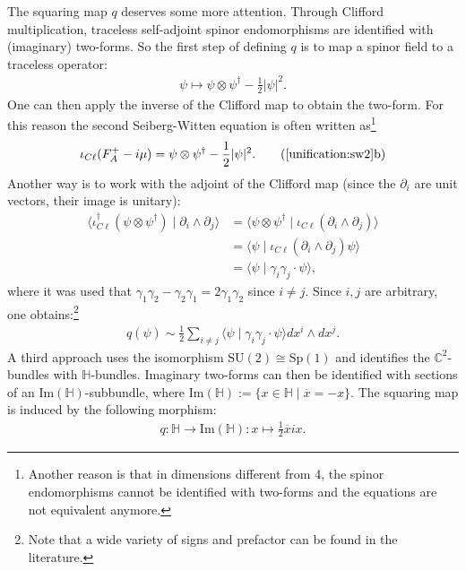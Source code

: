     \begin{construct}
        The squaring map $q$ deserves some more attention. Through Clifford multiplication, traceless self-adjoint spinor endomorphisms are identified with (imaginary) two-forms. So the first step of defining $q$ is to map a spinor field to a traceless operator:
        \begin{gather}
            \psi\mapsto\psi\otimes\psi^\dagger - \frac{1}{2}|\psi|^2.
        \end{gather}
        One can then apply the inverse of the Clifford map to obtain the two-form. For this reason the second Seiberg-Witten equation is often written as\footnote{Another reason is that in dimensions different from 4, the spinor endomorphisms cannot be identified with two-forms and the equations are not equivalent anymore.}
        \begin{gather}
            \iota_{C\ell}(F_A^+-i\mu) = \psi\otimes\psi^\dagger-\frac{1}{2}|\psi|^2.
            \tag{\ref*{unification:sw2}b}
        \end{gather}
        Another way is to work with the adjoint of the Clifford map (since the $\partial_i$ are unit vectors, their image is unitary):
        \begin{align*}
            \langle\iota_{C\ell}^\dagger(\psi\otimes\psi^\dagger)\mid\partial_i\wedge\partial_j\rangle &= \langle\psi\otimes\psi^\dagger\mid\iota_{C\ell}(\partial_i\wedge\partial_j)\rangle\\
            &= \langle\psi\mid\iota_{C\ell}(\partial_i\wedge\partial_j)\psi\rangle\\
            &= \langle\psi\mid\gamma_i\gamma_j\cdot\psi\rangle,
        \end{align*}
        where it was used that $\gamma_1\gamma_2-\gamma_2\gamma_1=2\gamma_1\gamma_2$ since $i\neq j$. Since $i,j$ are arbitrary, one obtains:\footnote{Note that a wide variety of signs and prefactor can be found in the literature.}
        \begin{gather}
            q(\psi)\sim\frac{1}{2}\sum_{i\neq j}\langle\psi\mid\gamma_i\gamma_j\cdot\psi\rangle dx^i\wedge dx^j.
        \end{gather}
        A third approach uses the isomorphism $\mathrm{SU}(2)\cong\mathrm{Sp}(1)$ and identifies the $\mathbb{C}^2$-bundles with $\mathbb{H}$-bundles. Imaginary two-forms can then be identified with sections of an $\mathrm{Im}(\mathbb{H})$-subbundle, where $\mathrm{Im}(\mathbb{H}):=\{x\in\mathbb{H}\mid\overline{x}=-x\}$. The squaring map is induced by the following morphism:
        \begin{gather}
            q:\mathbb{H}\rightarrow\mathrm{Im}(\mathbb{H}):x\mapsto\frac{1}{2}\overline{x}ix.
        \end{gather}
    \end{construct}

